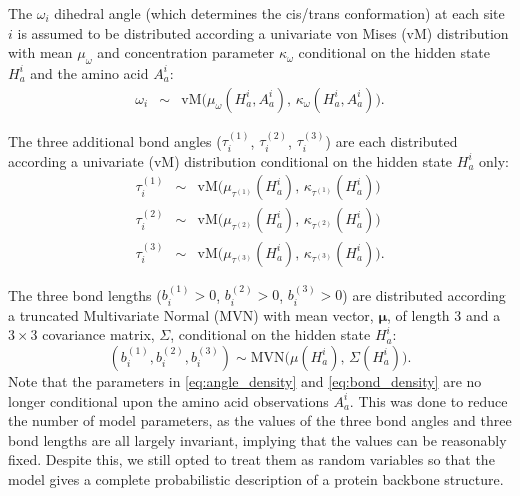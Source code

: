 \documentclass[nogrid]{MBE}%
\begin{document}
The $\omega_{i}$ dihedral angle (which determines the cis/trans conformation) at each site $i$ is assumed to be distributed according a univariate von Mises (vM) distribution with mean $\mu_{\omega}$ and concentration parameter $\kappa_{\omega}$ conditional on the hidden state $H_{a}^{i}$ and the amino acid $A_{a}^{i}$:
\begin{equation}
\label{eq:omega_dist}
\begin{array}{ccc}
\omega_{i} & \sim & \text{vM}\big(\mu_{\omega}(H_{a}^{i},A_{a}^{i}),\,\ensuremath{\kappa_{\omega}(H_{a}^{i},A_{a}^{i})}\big).
\end{array}
\end{equation}


The three additional bond angles ($\tau^{(1)}_{i}$, $\tau^{(2)}_{i}$, $\tau^{(3)}_{i}$) are each distributed according a univariate (vM) distribution conditional on the hidden state $H_{a}^{i}$ only:
\begin{equation}
\label{eq:angle_density}
\begin{array}{ccc}
\tau^{(1)}_{i} & \sim & \text{vM}\big(\mu_{\tau^{(1)}}(H_{a}^{i}),\,\ensuremath{\kappa_{\tau^{(1)}}(H_{a}^{i})}\big)
\\
\tau^{(2)}_{i} & \sim & \text{vM}\big(\mu_{\tau^{(2)}}(H_{a}^{i}),\,\ensuremath{\kappa_{\tau^{(2)}}(H_{a}^{i})}\big)
\\
\tau^{(3)}_{i} & \sim & \text{vM}\big(\mu_{\tau^{(3)}}(H_{a}^{i}),\,\ensuremath{\kappa_{\tau^{(3)}}(H_{a}^{i})}\big).
\end{array}
\end{equation}

The three bond lengths ($b_{i}^{(1)}>0$, $b_{i}^{(2)}>0$, $b_{i}^{(3)}>0$) are 
distributed according a truncated Multivariate Normal (MVN)
with mean vector, $\mathbf{\mu}$, of length 3 and a $3 \times 3$ covariance matrix, $\Sigma$, conditional on the hidden state $H_{a}^{i}$:
\begin{equation}
\label{eq:bond_density}
(b_{i}^{(1)}, b_{i}^{(2)}, b_{i}^{(3)})  \sim \text{MVN}\big(\mu(H_a^{i}),\,\Sigma(H_a^{i})\big).
\end{equation}
Note that the parameters in \eqref{eq:angle_density} and \eqref{eq:bond_density} are no longer conditional upon the amino acid observations $A_{a}^{i}$. This was done to reduce the number of model parameters, as the values of the three bond angles and three bond lengths are all largely invariant, implying that the values can be reasonably fixed. Despite this, we still opted to treat them as random variables so that the model gives a complete probabilistic description of a protein backbone structure.
\end{document}
